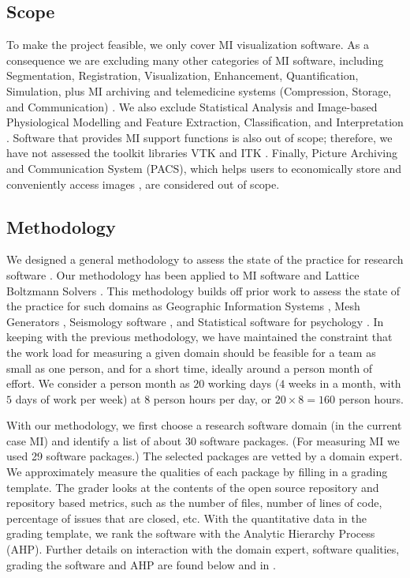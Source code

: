 \documentclass[11pt]{article}
\begin{document}
\subsection{Scope} \label{sec_scope}

To make the project feasible, we only cover MI visualization software.  As a
consequence we are excluding many other categories of MI software, including
Segmentation, Registration, Visualization, Enhancement, Quantification,
Simulation, plus MI archiving and telemedicine systems (Compression, Storage,
and Communication) \cite{Bankman2000, Angenent2006}.  We also exclude
Statistical Analysis and Image-based Physiological Modelling
\cite{enwiki:1034877594} and Feature Extraction, Classification, and
Interpretation \cite{Kim2011}. Software that provides MI support functions is
also out of scope; therefore, we have not assessed the toolkit libraries VTK
\cite{SchroederEtAl2006} and ITK \cite{McCormick2014}.  Finally, Picture
Archiving and Communication System (PACS), which helps users to economically
store and conveniently access images \cite{Choplin1992}, are considered out of
scope. 

\subsection{Methodology} \label{SecMethodology}

We designed a general methodology to assess the state of the practice for
research software \cite{SmithEtAl2021, SmithAndMichalski2022}.  Our methodology
has been applied to MI software \cite{Dong2021} and Lattice Boltzmann Solvers
\cite{Michalski2021, SmithEtAl2024}.  This methodology builds off prior work to
assess the state of the practice for such domains as Geographic Information
Systems \cite{smith2018state}, Mesh Generators \cite{smith2016state},
Seismology software \cite{Smith2018Seismology}, and Statistical software for
psychology \cite{smith2018statistical}.  In keeping with the previous
methodology, we have maintained the constraint that the work load for measuring
a given domain should be feasible for a team as small as one person, and for a
short time, ideally around a person month of effort. We consider a person month
as $20$ working days ($4$ weeks in a month, with $5$ days of work per week) at
$8$ person hours per day, or $20 \times 8 = 160$ person hours.

With our methodology, we first choose a research software domain (in the current
case MI) and identify a list of about 30 software packages. (For measuring MI we
used 29 software packages.)  The selected packages are vetted by a domain
expert. We approximately measure the qualities of each package by filling in a
grading template. The grader looks at the contents of the open source repository
and repository based metrics, such as the number of files, number of lines of
code, percentage of issues that are closed, etc.  With the quantitative data in
the grading template, we rank the software with the Analytic Hierarchy Process
(AHP). Further details on interaction with the domain expert, software
qualities, grading the software and AHP are found below and in
\cite{SmithEtAl2024_MI_SOP}.
\end{document}
